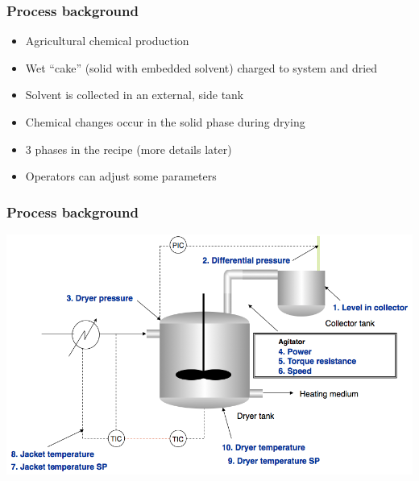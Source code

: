 \begin{frame}\frametitle{Process background}

\begin{itemize}
	\item	Agricultural chemical production
	
	\item	Wet ``cake'' (solid with embedded solvent) charged to system and dried
	
	\item	Solvent is collected in an external, side tank
	
	\item	Chemical changes occur in the solid phase during drying 
	
	\item	3 phases in the recipe (more details later)

	\item	Operators can adjust some parameters
\end{itemize}

\end{frame}

\begin{frame}\frametitle{Process background}


	\begin{center}
		\includegraphics[width=\textwidth]{images/fmc/fmc-batch-system.png}
	\end{center}

\end{frame}

